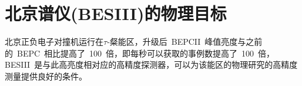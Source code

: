 \begin{comment}
升级后的~BEPCII~是一个多束团的双环对撞机。双环指的是正负电子束流分别注入在两个彼此独立的储存环中，经加速后在对撞点发生对撞。多束团对撞可以大幅度的提高亮度。~BEPCII~的峰值亮度设计为在~1.89Gev~处达~1$\times$$10^{33}$$cm^{-2}$$s^{-1}$。高亮度意味着可以获得大量的物理事例，为诸多基于巨大统计量的物理过程的研究和分析提供良好的实验基础。表~\ref{tbl:event-Number}~列出了~BEPCII~运行一年可以累积的各种物理事例数。
\begin{table}[h]
    \centering
    \caption{\label{tbl:event-Number} BEPCII运行一年可以积累的事例数}
    \footnotesize
    \begin{tabular}{llllc}
        \hline
        物理& 质心系能量& 峰值亮度& 物理截面& 每年产生事例数 \\
             &(Gev)      &($10^{33} $$cm^{-2}$$s^{-1}$)& (nb)\\
        \hline
        $J/\psi$& 3.097& 0.6& ～3400&  10$\times$$10^{9}$ \\
        $\tau$&   3.670& 1.0& ～2.4&    12$\times$$10^{6}$ \\
        $\psi'$&  3.686& 1.0& ～640&    3$\times$$10^{9}$\\
        D&        3.770& 1.0& ～6.5&    32$\times$$10^{6}$\\
        $D_{s}$&   4.040& 0.6& ～0.32&   1$\times$$10^{6}$\\
        $D_{s}$&   4.160& 0.6& ～1.0&    3$\times$$10^{6}$\\
        \hline
    \end{tabular}
\end{table}

\section{~BESIII~物理目标}
~BEPCII~运行在~$\tau$~-粲能区($\approx$~3~Gev),~BESIII~是运行在~BEPCII~上的大型通用探测器，通过收集~$\tau$~-粲能区的正负电子对撞产生的末态粒子进行~$\tau$~-粲物理研究。~BESIII~主要研究的物理目标有：轻强子谱、粲物理、~QCD~与~$\tau$~物理~\cite{wangyf2011}~\cite{chaokt:2009}。
\end{comment}

\section{北京谱仪(BESIII)的物理目标}
北京正负电子对撞机运行在$\tau$-粲能区，升级后~BEPCII~峰值亮度与之前的~BEPC~相比提高了~100~倍，即每秒可以获取的事例数提高了~100~倍，BESIII~是与此高亮度相对应的高精度探测器，可以为该能区的物理研究的高精度测量提供良好的条件。

